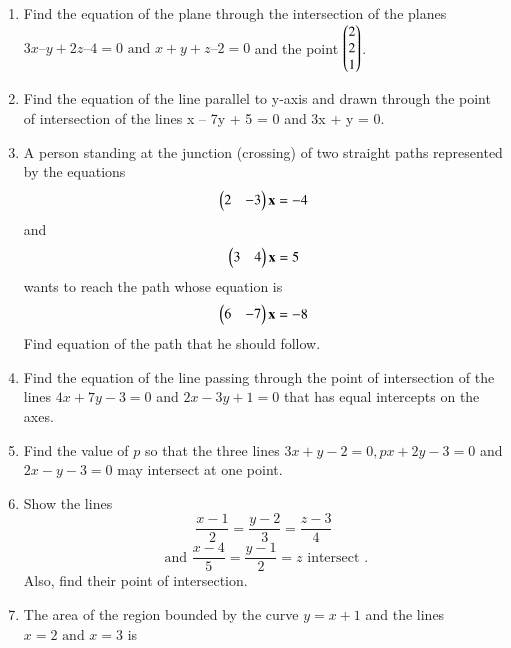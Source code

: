 \begin{enumerate}[label=\thesubsection.\arabic*,ref=\thesubsection.\theenumi]
	\item  Find the equation of the plane through the intersection of the planes $3{x} – {y} + 2{z} – 4 = 0 \text{ and } {x} + {y} + {z} – 2 = 0$ and the point $\begin{pmatrix}2\\2\\1\end{pmatrix}$.
		\label{prob:12/11/3/9/plane}
		\\
    \solution
		
	\item  Find the equation of the line parallel to y-axis and drawn through the point of
intersection of the lines x – 7y + 5 = 0 and 3x + y = 0.
\\
\solution
		
    \item A person standing at the junction (crossing) of two straight paths 
    represented by the equations 
    \begin{align}
        \begin{pmatrix}2&-3\end{pmatrix}\mathbf{x} = -4 
        \label{eq:chapters/11/10/4/24/L1}
    \end{align}
    and
    \begin{align}
        \begin{pmatrix}3&4\end{pmatrix}\mathbf{x} = 5
        \label{eq:chapters/11/10/4/24/L2}
    \end{align} 
    wants to reach the path whose equation is 
    \begin{align}
        \begin{pmatrix}6&-7\end{pmatrix}\mathbf{x} = -8
        \label{eq:chapters/11/10/4/24/L3}
    \end{align}
    Find equation of the path that he should follow.
\\
    \solution 
		
	\item Find the equation of the line passing through the point of intersection of the lines $4x + 7y - 3 = 0$ and $2x - 3y + 1 = 0$ that has equal intercepts on the axes.\\
	\solution 
	  
\item
Find the value of $p$ so that the three lines $3x+y-2=0, px+2y-3=0$ and $2x-y-3=0$ may intersect at one point.
\label{11.10.4.9}
\\
\solution

\item Show the lines
$$\frac{x-1}{2}=\frac{y-2}{3}=\frac{z-3}{4}$$
$$\text{ and } \frac{x-4}{5}=\frac{y-1}{2}=z  \text{ intersect }.$$
 Also, find their point of intersection.
\item The area of the region bounded by the curve $y = x + 1$ and the lines $x = 2\text{ and }x = 3$ is

\end{enumerate}
